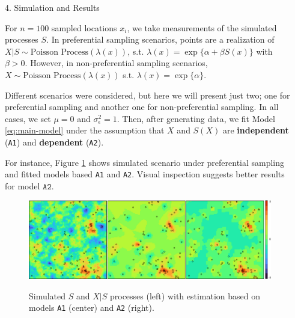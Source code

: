 \documentclass[12pt]{beamer}
\begin{document}
\begin{frame}[t]
\begin{columns}[t]
\begin{column}{0.30\textwidth}
			\end{column}
		
			\begin{column}{0.30\textwidth} \justifying %
		
			\begin{block}{\Large 4. Simulation and Results} \justifying \vspace{12pt}				
				
			For $n = 100$ sampled locations $x_i$, we take measurements of the simulated processes $S$. In preferential sampling scenarios, points are a realization of $X|S \sim \text{Poisson Process}(\lambda(x))$, s.t. $\lambda(x) = \exp\{\alpha + \beta S(x)\}$ with $\beta > 0$.  However, in non-preferential sampling scenarios, $X \sim \text{Poisson Process}(\lambda(x))$ s.t.  $\lambda(x) = \exp\{\alpha\}$.\vspace{18pt}
			
			Different scenarios were considered, but here we will present just two; one for preferential sampling and another one for non-preferential sampling. In all cases, we set $\mu = 0$ and $\sigma^2_{\epsilon} = 1$. Then, after generating data, we fit Model \eqref{eq:main-model} under the assumption that $X$ and $S(X)$ are \textbf{independent} (\texttt{A1}) and \textbf{dependent} (\texttt{A2}).\vspace{18pt}
			
			For instance, Figure \ref{fig:threeplots} shows simulated scenario under preferential sampling and fitted models based \texttt{A1} and \texttt{A2}. Visual inspection suggests better results for model $\texttt{A2}$.\vspace{9pt}
			\begin{figure}[!htb] \label{fig:threeplots}
				\begin{center}
					{\includegraphics[width=1\textwidth]{Images/three_plots.png}}
					\caption{\justifying Simulated $S$ and $X|S$ processes (left) with estimation based on models \texttt{A1} (center) and \texttt{A2} (right).}
				\end{center}
			\end{figure}
				

\end{block}
\end{column}
\end{columns}
\end{frame}
\end{document}
